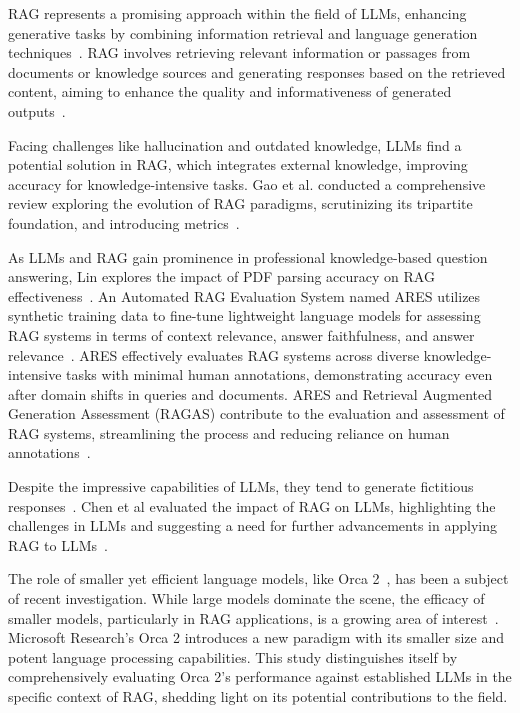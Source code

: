 \documentclass[runningheads]{llncs}
\begin{document}
RAG represents a promising approach within the field of LLMs, enhancing generative tasks by combining information retrieval and language generation techniques~\cite{es2023ragas,lewis2020retrieval,saad2023ares}. RAG involves retrieving relevant information or passages from documents or knowledge sources and generating responses based on the retrieved content, aiming to enhance the quality and informativeness of generated outputs~\cite{es2023ragas}.

Facing challenges like hallucination and outdated knowledge, LLMs find a potential solution in RAG, which integrates external knowledge, improving accuracy for knowledge-intensive tasks. Gao et al. conducted a comprehensive review exploring the evolution of RAG paradigms, scrutinizing its tripartite foundation, and introducing metrics~\cite{lewis2020retrieval}.

As LLMs and RAG gain prominence in professional knowledge-based question answering, Lin explores the impact of PDF parsing accuracy on RAG effectiveness~\cite{lin2024revolutionizing}. An Automated RAG Evaluation System named ARES utilizes synthetic training data to fine-tune lightweight language models for assessing RAG systems in terms of context relevance, answer faithfulness, and answer relevance~\cite{saad2023ares}. ARES effectively evaluates RAG systems across diverse knowledge-intensive tasks with minimal human annotations, demonstrating accuracy even after domain shifts in queries and documents. 
ARES and Retrieval Augmented Generation Assessment (RAGAS) contribute to the evaluation and assessment of RAG systems, streamlining the process and reducing reliance on human annotations~\cite{saad2023ares,es2023ragas}.

Despite the impressive capabilities of LLMs, they tend to generate fictitious responses~\cite{liu2023reta}. Chen et al evaluated the impact of RAG on LLMs, highlighting the challenges in LLMs and suggesting a need for further advancements in applying RAG to LLMs~\cite{chen2023benchmarking}.

The role of smaller yet efficient language models, like Orca 2~\cite{mitra2023orca}, has been a subject of recent investigation. While large models dominate the scene, the efficacy of smaller models, particularly in RAG applications, is a growing area of interest~\cite{mitra2023orca,mukherjee2023orca}. Microsoft Research's Orca 2 introduces a new paradigm with its smaller size and potent language processing capabilities. This study distinguishes itself by comprehensively evaluating Orca 2's performance against established LLMs in the specific context of RAG, shedding light on its potential contributions to the field.
\end{document}
